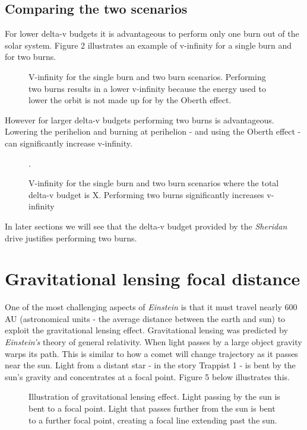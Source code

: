 \documentclass[12pt]{article} %
\begin{document}
\subsection{Comparing the two scenarios}

For lower delta-v budgets it is advantageous to perform only one burn out of the solar system. Figure 2 illustrates an example of v-infinity for a single burn and for two burns.

\begin{figure}

\caption{V-infinity for the single burn and two burn scenarios. Performing two burns results in a lower v-infinity because the energy used to lower the orbit is not made up for by the Oberth effect.}
\end{figure}

However for larger delta-v budgets performing two burns is advantageous. Lowering the perihelion and burning at perihelion - and using the Oberth effect - can significantly increase v-infinity.

\begin{figure}
\caption{V-infinity for the single burn and two burn scenarios where the total delta-v budget is X. Performing two burns significantly increases v-infinity}.
\end{figure}

In later sections we will see that the delta-v budget provided by the \textit{Sheridan} drive justifies performing two burns.


\section{Gravitational lensing focal distance}
One of the most challenging aspects of \textit{Einstein} is that it must travel nearly 600 AU (astronomical units - the average distance between the earth and sun) to exploit the gravitational lensing effect. Gravitational lensing was predicted by \textit{Einstein's} theory of general relativity. When light passes by a large object gravity warps its path. This is similar to how a comet will change trajectory as it passes near the sun. Light from a distant star - in the story Trappist 1 - is bent by the sun's gravity and concentrates at a focal point. Figure 5 below illustrates this.

\begin{figure}
\caption{Illustration of gravitational lensing effect. Light passing by the sun is bent to a focal point. Light that passes further from the sun is bent to a further focal point, creating a focal line extending past the sun.}
\end{figure}
\end{document}

